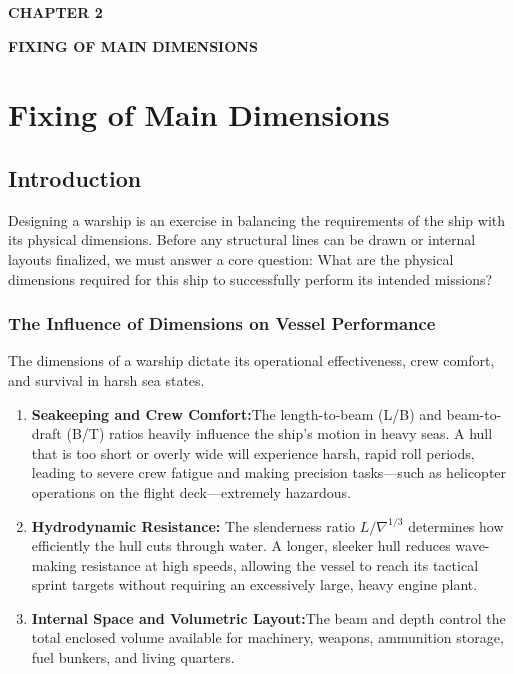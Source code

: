 \documentclass[12pt,a4paper,twoside]{report}
\begin{document}
\clearpage
\thispagestyle{empty}

\begin{center}
    \vspace*{\fill}

    {\fontsize{16}{19}\selectfont\bfseries CHAPTER 2\par}
    \vspace{0.6cm}
    {\fontsize{16}{19}\selectfont\bfseries FIXING OF MAIN DIMENSIONS\par}

    \vspace*{\fill}
\end{center}

\clearpage
\clearpage
\thispagestyle{empty}
\null
\newpage
    \chapter{Fixing of Main Dimensions}
    \section{Introduction}
    Designing a warship is an exercise in balancing the requirements of the ship with its physical dimensions. Before any structural lines can be drawn or internal layouts finalized, we must answer a core question: What are the physical dimensions required for this ship to successfully perform its intended missions?
    \subsection{The Influence of Dimensions on Vessel Performance}
    The dimensions of a warship dictate its operational effectiveness, crew comfort, and survival in harsh sea states.
\begin{enumerate}[\alph*)]
    \item\textbf{Seakeeping and Crew Comfort:}The length-to-beam (L/B) and beam-to-draft (B/T) ratios heavily influence the ship’s motion in heavy seas. A hull that is too short or overly wide will experience harsh, rapid roll periods, leading to severe crew fatigue and making precision tasks—such as helicopter operations on the flight deck—extremely hazardous.
    \item \textbf{Hydrodynamic Resistance:}	The slenderness ratio  ${L/\nabla^{1/3}}$ determines how efficiently the hull cuts through water. A longer, sleeker hull reduces wave-making resistance at high speeds, allowing the vessel to reach its tactical sprint targets without requiring an excessively large, heavy engine plant.
    \item \textbf{	Internal Space and Volumetric Layout:}The beam and depth control the total enclosed volume available for machinery, weapons, ammunition storage, fuel bunkers, and living quarters.
    \end{enumerate}
\end{document}
